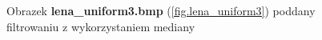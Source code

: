 \documentclass{classrep}
\begin{document}
\begin{figure}
{{  \label{fig.lena_uniform3_median_5x5}
 }
}
\caption{Obrazek \textbf{lena\_uniform3.bmp} (\ref{fig.lena_uniform3}) poddany filtrowaniu z wykorzystaniem mediany}
\label{fig.lena_uniform3_median}
\end{figure}
\end{document}
